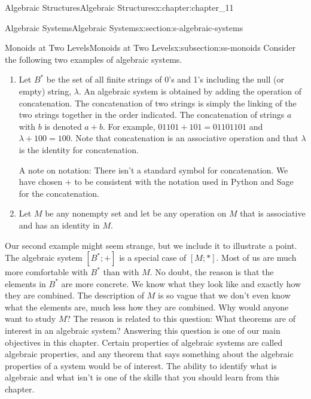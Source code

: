 \documentclass[oneside,10pt,]{book}
\numberwithin{equation}{section}
\begin{document}
\begin{chapterptx}{Algebraic Structures}{}{Algebraic Structures}{}{}{x:chapter:chapter_11}
\begin{sectionptx}{Algebraic Systems}{}{Algebraic Systems}{}{}{x:section:s-algebraic-systems}
\begin{introduction}{}
\end{introduction}%
%
%
\typeout{************************************************}
\typeout{************************************************}
%
\begin{subsectionptx}{Monoids at Two Levels}{}{Monoids at Two Levels}{}{}{x:subsection:ss-monoids}
Consider the following two examples of algebraic systems.%
\par
%
\begin{enumerate}[label=(\alph*)]
\item{}\label{g:notation:idm546599749232}  Let \(B^*\) be the set of all finite strings of 0's and 1's including the null (or empty) string, \(\lambda\). An algebraic system is obtained by adding the operation of concatenation. The concatenation of two strings is simply the linking of the two strings together in the order indicated. The concatenation of strings \(a\) with \(b\) is denoted \(a+b\).  For example, \(01101+101 =01101101\) and \(\lambda +100 = 100\). Note that concatenation is an associative operation and that \(\lambda\)  is the identity for concatenation.%
\par
A note on notation:  There isn't a standard symbol for concatenation.  We have chosen \(+\) to be consistent with the notation used in Python and Sage for the concatenation.%
\item{}Let \(M\) be any nonempty set and let \textasteriskcentered{} be any operation on \(M\) that is associative and has an identity in \(M\).%
\end{enumerate}
%
\par
Our second example might seem strange, but we include it to illustrate a point. The algebraic system \(\left[B^*;+\right]\) is a special case of \([M;*]\).  Most of us are much more comfortable with \(B^*\) than with \(M\).  No doubt, the reason is that the elements in \(B^*\) are more concrete.  We know what they look like and exactly how they are combined. The description of \(M\) is so vague that we don't even know what the elements are, much less how they are combined. Why would anyone want to study \(M\)? The reason is related to this question: What theorems are of interest in an algebraic system? Answering this question is one of our main objectives in this chapter.  Certain properties of algebraic systems are called algebraic properties, and any theorem that says something about the algebraic properties of a system would be of interest. The ability to identify what is algebraic and what isn't is one of the skills that you should learn from this chapter.%

\end{subsectionptx}
\end{sectionptx}
\end{chapterptx}
\end{document}
